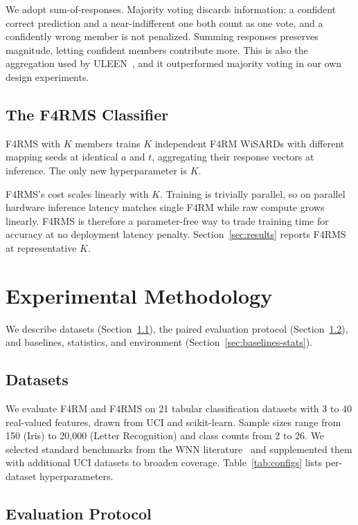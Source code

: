 \documentclass[runningheads]{llncs}
\begin{document}
We adopt sum-of-responses. Majority voting discards information: a confident correct prediction and a near-indifferent one both count as one vote, and a confidently wrong member is not penalized. Summing responses preserves magnitude, letting confident members contribute more. This is also the aggregation used by ULEEN~\cite{susskind2023uleen}, and it outperformed majority voting in our own design experiments.

\subsection{The F4RMS Classifier}
\label{sec:f4rms-classifier}

F4RMS with $K$ members trains $K$ independent F4RM WiSARDs with different mapping seeds at identical $a$ and $t$, aggregating their response vectors at inference. The only new hyperparameter is $K$.

F4RMS's cost scales linearly with $K$. Training is trivially parallel, so on parallel hardware inference latency matches single F4RM while raw compute grows linearly. F4RMS is therefore a parameter-free way to trade training time for accuracy at no deployment latency penalty. Section~\ref{sec:results} reports F4RMS at representative $K$.


\section{Experimental Methodology}
\label{sec:methodology}

We describe datasets (Section~\ref{sec:datasets}), the paired evaluation protocol (Section~\ref{sec:protocol}), and baselines, statistics, and environment (Section~\ref{sec:baselines-stats}).

\subsection{Datasets}
\label{sec:datasets}

We evaluate F4RM and F4RMS on 21 tabular classification datasets with 3 to 40 real-valued features, drawn from UCI and scikit-learn. Sample sizes range from 150 (Iris) to 20{,}000 (Letter Recognition) and class counts from 2 to 26. We selected standard benchmarks from the WNN literature~\cite{susskind2022bthowen,susskind2023uleen} and supplemented them with additional UCI datasets to broaden coverage. Table~\ref{tab:configs} lists per-dataset hyperparameters.

\subsection{Evaluation Protocol}
\label{sec:protocol}
\end{document}
